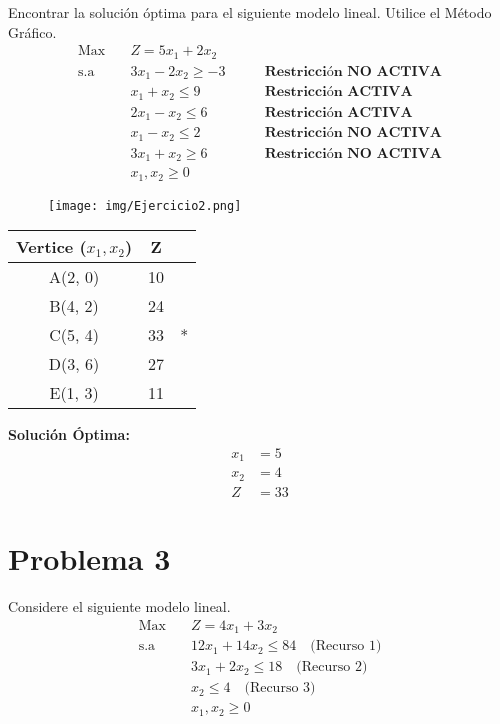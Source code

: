 \documentclass{templateNote}
\begin{document}
Encontrar la solución óptima para el siguiente modelo lineal. Utilice el Método Gráfico.
\begin{equation*}
    \begin{aligned}
        \text{Max} \quad & Z = 5x_1 + 2x_2 \\
        \text{s.a} \quad & 3x_1 - 2x_2 \geq -3 \qquad &\textbf{Restricci\'on NO ACTIVA} \\
        & x_1 + x_2 \leq 9 \qquad &\textbf{Restricci\'on ACTIVA} \\
        & 2x_1 - x_2 \leq 6 \qquad &\textbf{Restricci\'on ACTIVA} \\
        & x_1 - x_2 \leq 2 \qquad &\textbf{Restricci\'on NO ACTIVA} \\
        & 3x_1 + x_2 \geq 6 \qquad &\textbf{Restricci\'on NO ACTIVA} \\
        & x_1, x_2 \geq 0
    \end{aligned}
\end{equation*}
\begin{figure}[H]
    \centering
    \texttt{[image: img/Ejercicio2.png]}
\end{figure}
\begin{center}
    \begin{tabular}{|c|c|c|}
        \hline
        \textbf{Vertice ($x_1,x_2$)} & Z &  \\ \hline
        A(2, 0) & 10 & \\ \hline
        B(4, 2) & 24 & \\ \hline
        C(5, 4) & 33 & * \\ \hline
        D(3, 6) & 27 & \\ \hline
        E(1, 3) & 11 & \\ \hline
    \end{tabular}
\end{center}

\textbf{Soluci\'on \'Optima:}
\begin{align*}
    x_1 &= 5 \\ 
    x_2 &= 4 \\
    Z &= 33
\end{align*}

\newpage
\section*{Problema 3}

Considere el siguiente modelo lineal.
\begin{equation*}
    \begin{aligned}
        \text{Max} \quad & Z = 4x_1 + 3x_2 \\
        \text{s.a} \quad & 12x_1 + 14x_2 \leq 84 \quad \text{(Recurso 1)} \\
        & 3x_1 + 2x_2 \leq 18 \quad \text{(Recurso 2)} \\
        & x_2 \leq 4 \quad \text{(Recurso 3)} \\
        & x_1, x_2 \geq 0
    \end{aligned}
\end{equation*}
\end{document}
